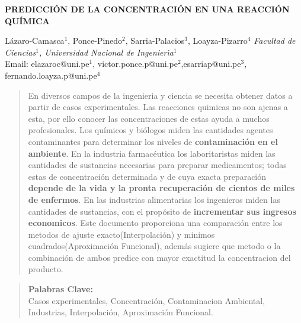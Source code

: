\documentclass[10pt,a4paper]{article}
\begin{document}
	\begin{center}
		{\Large \textbf{PREDICCIÓN DE LA CONCENTRACIÓN EN UNA REACCIÓN QUÍMICA}}
	\end{center}
	\begin{center}
		Lázaro-Camasca$^{1}$, Ponce-Pinedo$^{2}$, Sarria-Palacios$^{3}$, Loayza-Pizarro$^{4}$\vskip5pt
		{\it Facultad de Ciencias$^1$, Universidad Nacional de Ingenier\'{\i}a$^1$\\}\vskip5pt
		Email: elazaroc@uni.pe$^{1}$, victor.ponce.p@uni.pe$^{2}$,esarriap@uni.pe$^{3}$, fernando.loayza.p@uni.pe$^{4}$
	\end{center}
	\vspace*{0.4cm}
	
	\begin{abstract}
		
		En diversos campos de la ingenieria y ciencia se necesita obtener datos a partir de casos experimentales. Las reacciones quimicas no son ajenas a esta, por ello conocer las concentraciones de estas ayuda a muchos profesionales. Los químicos y biólogos miden las cantidades agentes contaminantes para determinar los niveles de \textbf{contaminación en el ambiente}. En la industria farmacéutica los laboritaristas miden las cantidades de sustancias necesarias para preparar medicamentos; todas estas de concentración determinada y de cuya exacta preparación \textbf{depende de la vida y la pronta recuperación de cientos de miles de enfermos}. En las industrias alimentarias los ingenieros miden las cantidades de sustancias, con el propósito de \textbf{incrementar sus ingresos economicos}. Este documento proporciona una comparación entre los metodos de ajuste exacto(Interpolación) y minimos cuadrados(Aproximación Funcional), además sugiere que metodo o la combinación de ambos predice con mayor exactitud la concentracion del producto.
		
	\end{abstract}
	
	
	\begin{quotation}
		{\small
			\noindent\textbf{Palabras Clave:} \\ 
			Casos experimentales, Concentración, Contaminacion Ambiental, Industrias, Interpolación, Aproximación Funcional.
		}
	\end{quotation}
	
	
	\renewcommand{\abstractname}{Abstract}
	
\end{document}
